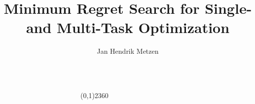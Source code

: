 \documentclass{beamer}
\title{Minimum Regret Search for Single- and Multi-Task Optimization}
\author{Jan Hendrik Metzen}
\newcommand{\maincolor}{red}
\begin{document}
\begin{frame}

\begin{columns}[t]
\begin{column}{.48\textwidth}

\end{column}

\begin{column}{4pt}
\begin{center}
\color{\maincolor}
\linethickness{2pt}
\line(0,1){2360}
\end{center}
\end{column}

\begin{column}{.48\textwidth}

\end{column}
\end{columns}
\end{frame}
\end{document}
